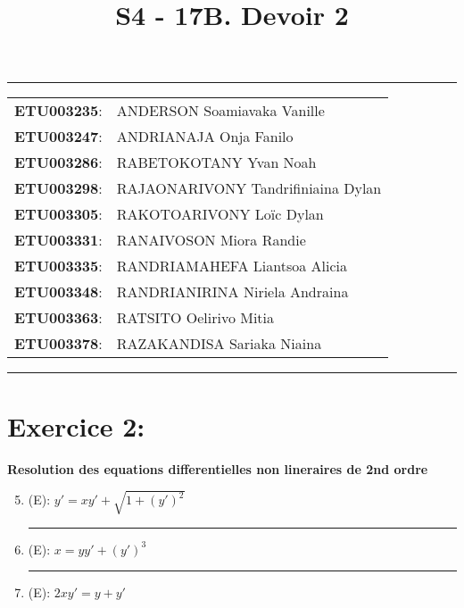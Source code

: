 \documentclass[a4paper,12pt]{article}
\begin{document}
	
\title{\textbf{S4 - 17B. Devoir 2}}
\date{}
\maketitle

\hrule
\vspace{1em}

\begin{tabular}{rl}
	\textbf{ETU003235}: & ANDERSON Soamiavaka Vanille \\
	\textbf{ETU003247}: & ANDRIANAJA Onja Fanilo \\
	\textbf{ETU003286}: & RABETOKOTANY Yvan Noah \\
	\textbf{ETU003298}: & RAJAONARIVONY Tandrifiniaina Dylan \\
	\textbf{ETU003305}: & RAKOTOARIVONY Loïc Dylan \\
	\textbf{ETU003331}: & RANAIVOSON Miora Randie \\
	\textbf{ETU003335}: & RANDRIAMAHEFA Liantsoa Alicia \\
	\textbf{ETU003348}: & RANDRIANIRINA Niriela Andraina \\
	\textbf{ETU003363}: & RATSITO Oelirivo Mitia \\
	\textbf{ETU003378}: & RAZAKANDISA Sariaka Niaina \\
\end{tabular}

\vspace{1em}
\hrule

\newpage
\section*{Exercice 2:}
\textbf{Resolution des equations differentielles non lineraires de 2nd ordre}

\begin{enumerate}
	\setcounter{enumi}{4}
	\vspace{1cm}	
	\item (E): $y' = xy' + \sqrt{1+(y')^2}$ \\
	
	
	\vspace{1cm}
	\hrule
	\vspace{1cm}

	\item (E): $x = yy' + (y')^3$ \\
	
	
	\vspace{1cm}
	\hrule
	\vspace{1cm}

	\item (E): $2xy' = y + y'$ \\
	
	\vspace{1cm}
	

\end{enumerate}
\end{document}
